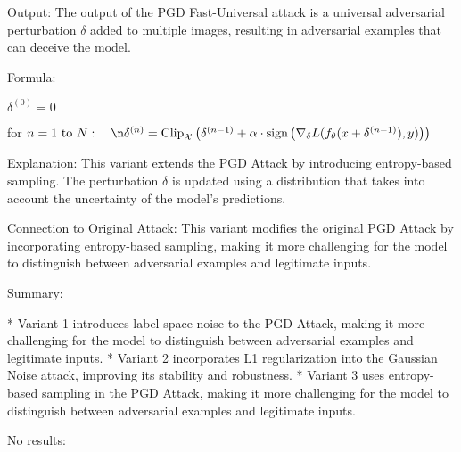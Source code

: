 Output: The output of the PGD Fast-Universal attack is a universal adversarial perturbation $\delta$ added to multiple images, resulting in adversarial examples that can deceive the model.

Formula:

$\delta^{(0)} = 0$

for $n = 1 \text{ to } N: \quad\n\delta^{(n)} = \text{Clip}_{\mathcal{X}} \left( \delta^{(n-1)} + \alpha \cdot \text{sign} \left( \nabla_\delta L(f_\theta(x + \delta^{(n-1)}), y) \right) \right)$

Explanation: This variant extends the PGD Attack by introducing entropy-based sampling. The perturbation $\delta$ is updated using a distribution that takes into account the uncertainty of the model's predictions.

Connection to Original Attack: This variant modifies the original PGD Attack by incorporating entropy-based sampling, making it more challenging for the model to distinguish between adversarial examples and legitimate inputs.

Summary:

* Variant 1 introduces label space noise to the PGD Attack, making it more challenging for the model to distinguish between adversarial examples and legitimate inputs.
* Variant 2 incorporates L1 regularization into the Gaussian Noise attack, improving its stability and robustness.
* Variant 3 uses entropy-based sampling in the PGD Attack, making it more challenging for the model to distinguish between adversarial examples and legitimate inputs.

No results:
